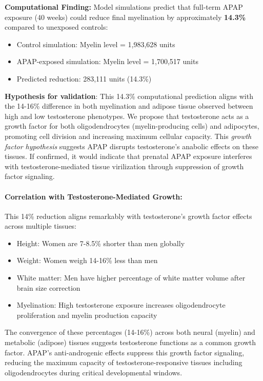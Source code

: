 \documentclass[11pt]{article}
\begin{document}
\begin{keyfindings}
\textbf{Computational Finding:} Model simulations predict that full-term APAP exposure (40 weeks) could reduce final myelination by approximately \textbf{14.3\%} compared to unexposed controls:
\begin{itemize}
\item Control simulation: Myelin level = 1,983,628 units
\item APAP-exposed simulation: Myelin level = 1,700,517 units  
\item Predicted reduction: 283,111 units (14.3\%)
\end{itemize}
\textbf{Hypothesis for validation}: This 14.3\% computational prediction aligns with the 14-16\% difference in both myelination and adipose tissue observed between high and low testosterone phenotypes. We propose that testosterone acts as a growth factor for both oligodendrocytes (myelin-producing cells) and adipocytes, promoting cell division and increasing maximum cellular capacity. This \textit{growth factor hypothesis} suggests APAP disrupts testosterone's anabolic effects on these tissues. If confirmed, it would indicate that prenatal APAP exposure interferes with testosterone-mediated tissue virilization through suppression of growth factor signaling.
\end{keyfindings}
 

\paragraph{Correlation with Testosterone-Mediated Growth:} This 14\% reduction aligns remarkably with testosterone's growth factor effects across multiple tissues:
\begin{itemize}
\item Height: Women are 7-8.5\% shorter than men globally
\item Weight: Women weigh 14-16\% less than men
\item White matter: Men have higher percentage of white matter volume after brain size correction
\item Myelination: High testosterone exposure increases oligodendrocyte proliferation and myelin production capacity
\end{itemize}

The convergence of these percentages (14-16\%) across both neural (myelin) and metabolic (adipose) tissues suggests testosterone functions as a common growth factor. APAP's anti-androgenic effects suppress this growth factor signaling, reducing the maximum capacity of testosterone-responsive tissues including oligodendrocytes during critical developmental windows.
\end{document}
